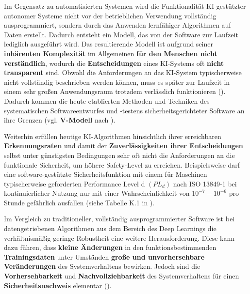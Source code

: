 \documentclass [oneside,10pt,a4paper,ngerman,BCOR10mm,headsepline,parindent,final]{scrartcl}
\begin{document}
Im Gegensatz zu automatisierten Systemen wird die Funktionalität
KI-gestützter autonomer Systeme nicht vor der betrieblichen Verwendung
vollständig ausprogrammiert, sondern durch das Anwenden lernfähiger
Algorithmen auf Daten erstellt. Dadurch entsteht ein Modell, das von der
Software zur Laufzeit lediglich ausgeführt wird. Das resultierende
Modell ist aufgrund seiner \textbf{inhärenten Komplexität} im
Allgemeinen \textbf{für den Menschen nicht verständlich}, wodurch die
\textbf{Entscheidungen} eines KI-Systems oft \textbf{nicht transparent}
sind. Obwohl die Anforderungen an das KI-System typischerweise nicht
vollständig beschrieben werden können, muss es später zur Laufzeit in
einem sehr großen Anwendungsraum trotzdem verlässlich funktionieren
(\cite{Schneider_2021}). Dadurch kommen die heute etablierten Methoden
und Techniken des systematischen Softwareentwurfes und -testens
sicherheitsgerichteter Software an ihre Grenzen (vgl. \textbf{V-Modell}
nach \cite{DIN_EN_61508-3_2011-02}).

Weiterhin erfüllen heutige KI-Algorithmen hinsichtlich ihrer
erreichbaren \textbf{Erkennungsraten} und damit der
\textbf{Zuverlässigkeiten ihrer Entscheidungen} selbst unter günstigsten
Bedingungen sehr oft nicht die Anforderungen an die funktionale
Sicherheit, um höhere Safety-Level zu erreichen. Beispielsweise darf
eine software-gestützte Sicherheitsfunktion mit einem für Maschinen
typischerweise geforderten Performance Level d \((PL_{d})\) nach ISO
13849-1 bei kontinuierlicher Nutzung nur mit einer Wahrscheinlichkeit
von \(10^{-7} - 10^{-6}\) pro Stunde gefährlich ausfallen (siehe Tabelle
K.1 in \cite{DIN_EN_ISO_13849-1_2016}).

Im Vergleich zu traditioneller, vollständig ausprogrammierter Software
ist bei datengetriebenen Algorithmen aus dem Bereich des Deep Learnings
die verhältnismäßig geringe Robustheit eine weitere Herausforderung.
Diese kann dazu führen, dass \textbf{kleine Änderungen} in den
funktionsbestimmenden \textbf{Trainingsdaten} unter Umständen
\textbf{große und unvorhersehbare Veränderungen} des Systemverhaltens
bewirken. Jedoch sind die \textbf{Vorhersehbarkeit} und
\textbf{Nachvollziehbarkeit} des Systemverhaltens für einen
\textbf{Sicherheitsnachweis} elementar
(\cite{BAuA_Rechtsgutachten_KI_2021}).
\end{document}
